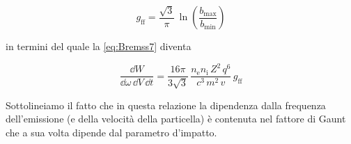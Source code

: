 \begin{EQ}
\begin{equation}
g_\mathrm{ff} = \dfrac{\sqrt{3}}{\pi} \, \ln\left(\dfrac{b_\mathrm{max}}{b_\mathrm{min}}\right) 
\end{equation} 
\end{EQ}
in termini del quale la \ref{eq:Bremss7} diventa
\begin{EQ}
\begin{equation}
\dfrac{\dd W}{\dd \omega\,\dd V \, \dd t} = \dfrac{16\pi}{3\sqrt{3}} \, \dfrac{n_\mathrm{e} n_\mathrm{i} \, Z^2\, q^6}{c^3\,m^2\,v} \, g_\mathrm{ff} \label{eq:Bremss8}
\end{equation}
\end{EQ}
Sottolineiamo il fatto che in questa relazione la dipendenza dalla frequenza dell'emissione (e della velocità della particella) è contenuta nel fattore di Gaunt che a sua volta dipende dal parametro d'impatto.

